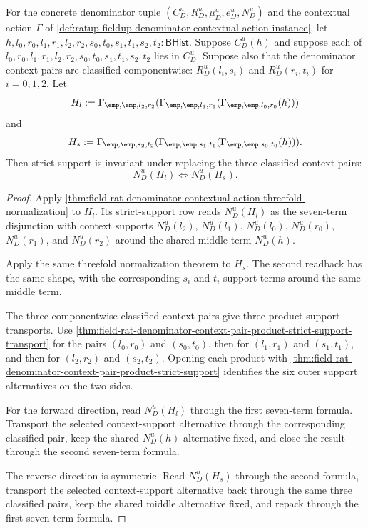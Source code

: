 \begin{theorem}
\label{thm:ratup-fieldup-contextual-action-threefold-pair-support-transport}
For the concrete denominator tuple
$(C_D^u,R_D^u,\mu_D^u,e_D^u,N_D^u)$ and the contextual action $\Gamma$ of
\autoref{def:ratup-fieldup-denominator-contextual-action-instance}, let
$h,l_0,r_0,l_1,r_1,l_2,r_2,s_0,t_0,s_1,t_1,s_2,t_2:\mathsf{BHist}$.
Suppose $C_D^u(h)$ and suppose each of
$l_0,r_0,l_1,r_1,l_2,r_2,s_0,t_0,s_1,t_1,s_2,t_2$ lies in $C_D^u$. Suppose
also that the denominator context pairs are classified componentwise:
$R_D^u(l_i,s_i)$ and $R_D^u(r_i,t_i)$ for $i=0,1,2$. Let
$$
H_l:=
\Gamma_{\emp,\emp,l_2,r_2}
(\Gamma_{\emp,\emp,l_1,r_1}(\Gamma_{\emp,\emp,l_0,r_0}(h)))
$$
and
$$
H_s:=
\Gamma_{\emp,\emp,s_2,t_2}
(\Gamma_{\emp,\emp,s_1,t_1}(\Gamma_{\emp,\emp,s_0,t_0}(h))).
$$
Then strict support is invariant under replacing the three classified context
pairs:
$$
N_D^u(H_l)\Longleftrightarrow N_D^u(H_s).
$$
\end{theorem}
\begin{proof}
Apply
\autoref{thm:field-rat-denominator-contextual-action-threefold-normalization}
to $H_l$. Its strict-support row reads $N_D^u(H_l)$ as the seven-term
disjunction with context supports
$N_D^u(l_2)$, $N_D^u(l_1)$, $N_D^u(l_0)$, $N_D^u(r_0)$, $N_D^u(r_1)$, and
$N_D^u(r_2)$ around the shared middle term $N_D^u(h)$.

Apply the same threefold normalization theorem to $H_s$. The second readback
has the same shape, with the corresponding $s_i$ and $t_i$ support terms
around the same middle term.

The three componentwise classified context pairs give three product-support
transports. Use
\autoref{thm:field-rat-denominator-context-pair-product-strict-support-transport}
for the pairs $(l_0,r_0)$ and $(s_0,t_0)$, then for $(l_1,r_1)$ and
$(s_1,t_1)$, and then for $(l_2,r_2)$ and $(s_2,t_2)$. Opening each product
with
\autoref{thm:field-rat-denominator-context-pair-product-strict-support}
identifies the six outer support alternatives on the two sides.

For the forward direction, read $N_D^u(H_l)$ through the first seven-term
formula. Transport the selected context-support alternative through the
corresponding classified pair, keep the shared $N_D^u(h)$ alternative fixed,
and close the result through the second seven-term formula.

The reverse direction is symmetric. Read $N_D^u(H_s)$ through the second
formula, transport the selected context-support alternative back through the
same three classified pairs, keep the shared middle alternative fixed, and
repack through the first seven-term formula.
\end{proof}


